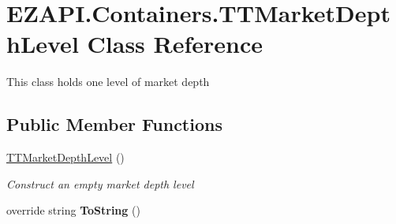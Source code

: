 \hypertarget{class_e_z_a_p_i_1_1_containers_1_1_t_t_market_depth_level}{\section{E\-Z\-A\-P\-I.\-Containers.\-T\-T\-Market\-Depth\-Level Class Reference}
\label{class_e_z_a_p_i_1_1_containers_1_1_t_t_market_depth_level}
}


This class holds one level of market depth  


\subsection*{Public Member Functions}
\begin{DoxyCompactItemize}
\item 
\hyperlink{class_e_z_a_p_i_1_1_containers_1_1_t_t_market_depth_level_adb68a8c0741dfa26a193c7abe9005981}{T\-T\-Market\-Depth\-Level} ()
\begin{DoxyCompactList}\small\item\em Construct an empty market depth level \end{DoxyCompactList}\item 
\hypertarget{class_e_z_a_p_i_1_1_containers_1_1_t_t_market_depth_level_a9ee6282f12e8468ad8ba19a399fd7c87}{override string {\bfseries To\-String} ()}\label{class_e_z_a_p_i_1_1_containers_1_1_t_t_market_depth_level_a9ee6282f12e8468ad8ba19a399fd7c87}

\end{DoxyCompactItemize}
